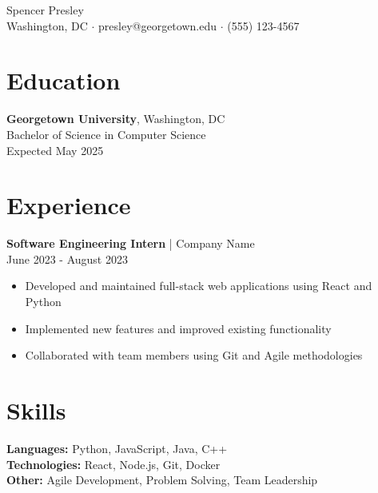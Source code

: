 \documentclass{article}
\begin{document}
\begin{center}
    \huge{Spencer Presley}\\[0.5em]
    \normalsize{
        Washington, DC $\cdot$ 
        presley@georgetown.edu $\cdot$
        (555) 123-4567
    }
\end{center}

\section*{Education}
\textbf{Georgetown University}, Washington, DC\\
Bachelor of Science in Computer Science\\
Expected May 2025

\section*{Experience}
\textbf{Software Engineering Intern} | Company Name\\
June 2023 - August 2023
\begin{itemize}
    \item Developed and maintained full-stack web applications using React and Python
    \item Implemented new features and improved existing functionality
    \item Collaborated with team members using Git and Agile methodologies
\end{itemize}

\section*{Skills}
\textbf{Languages:} Python, JavaScript, Java, C++\\
\textbf{Technologies:} React, Node.js, Git, Docker\\
\textbf{Other:} Agile Development, Problem Solving, Team Leadership
\end{document}
